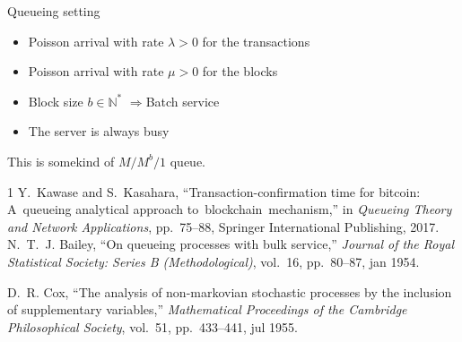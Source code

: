 \documentclass{beamer}
\begin{document}
\begin{frame}{Queueing setting}

\begin{itemize}
\item Poisson arrival with rate $\lambda>0$ for the transactions
\item Poisson arrival with rate $\mu>0$ for the blocks 
\item Block size $b\in\mathbb{N}^\ast$
$\Rightarrow $Batch service
\item[\warning] The server is always busy
\end{itemize}
This is somekind of $M/M^b/1$ queue.
\tiny
\begin{thebibliography}{1}
Y.~Kawase and S.~Kasahara, ``Transaction-confirmation time for bitcoin:
  A~queueing analytical approach to~blockchain~mechanism,'' in {\em Queueing
  Theory and Network Applications}, pp.~75--88, Springer International
  Publishing, 2017.
N.~T.~J. Bailey, ``On queueing processes with bulk service,'' {\em Journal of
  the Royal Statistical Society: Series B (Methodological)}, vol.~16,
  pp.~80--87, jan 1954.

D.~R. Cox, ``The analysis of non-markovian stochastic processes by the
  inclusion of supplementary variables,'' {\em Mathematical Proceedings of the
  Cambridge Philosophical Society}, vol.~51, pp.~433--441, jul 1955.

\end{thebibliography}
\end{frame}
\end{document}
